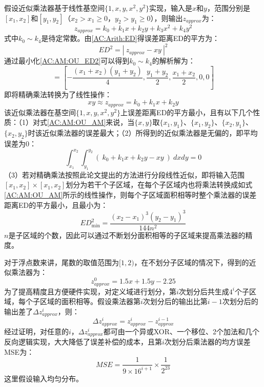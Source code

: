 假设近似乘法器基于线性基空间$\{1, x, y, x^2, y^2\}$实现，输入是$x$和$y$，范围分别是$[x_1,x_2]$和$[y_1,y_2]$（$x_2 > x_1 \ge 0$，$y_2 > y_1 \ge 0$），则输出$z_{approx}$为：
\begin{equation}
    z_{approx} = k_0 + k_1 x + k_2 y + k_3 x^2 + k_4 y^2
\end{equation}
式中$k_0 \sim k_4$是待定常数。由\eqref{AC:Arith:ED}得误差距离ED的平方为：
\begin{equation}
    ED^2 = | \ z_{approx} - xy \ | ^2
\label{AC:AM:OU_ED2}
\end{equation}
通过最小化\eqref{AC:AM:OU_ED2}可以得到$k_0 \sim k_4$的解析解为：
\begin{equation}
    [k_{0}, k_{1}, k_{2}, k_{3}, k_{4}]=[-\frac{(x_{1}+x_{2})(y_{1}+y_{2})}{4},\frac{y_{1}+y_{2}}{2},\frac{x_{1}+x_{2}}{2}, 0,0]
\end{equation}
即将精确乘法转换为了线性操作：
\begin{equation} 
    xy \approx z_{approx} = k_{0}+k_{1}x+k_{2}y
\label{AC:AM:OU_AM}
\end{equation}
该近似乘法器在基空间$\{1, x, y, x^2, y^2\}$上误差距离ED的平方最小，且有以下几个性质：（1）对式\eqref{AC:AM:OU_AM}来说，当$\{x,y\}$取$\{x_1,y_1\}$、$\{x_1,y_2\}$、$\{x_2,y_1\}$、$\{x_2,y_2\}$时该近似乘法器的误差最大；（2）所得到的近似乘法器是无偏的，即平均误差为0：
\begin{equation} 
    \int\nolimits_{x_{1}}^{x_{2}}\int\nolimits_{y_{1}}^{y_{2}} ( \ k_{0}+k_{1}x+k_{2}y - xy \ ) \ dxdy = 0
\end{equation}
（3）若对精确乘法按照此论文提出的方法进行分段线性近似，即将输入范围$[x_1,x_2] \times [x_1,x_2]$划分为若干个子区域，在每个子区域内也将乘法转换成如式\eqref{AC:AM:OU_AM}所示的线性操作，则每个子区域面积相等时整个乘法器的误差距离ED的平方最小，且最小为：
\begin{equation}
    ED^2_\text{min} = \dfrac{ (x_2 - x_1)^3 (y_2 - y_1)^3 }{144 n^2}
\end{equation}
$n$是子区域的个数，因此可以通过不断划分面积相等的子区域来提高乘法器的精度。

对于浮点数来讲，尾数的取值范围为$[1,2)$，在不划分子区域的情况下，得到的近似乘法器为：
\begin{equation}
    z^0_{approx} = 1.5 x + 1.5 y - 2.25
\end{equation}
为了提高精度且方便硬件实现，对定义域进行划分，第$i$次划分后共生成$4^i$个子区域，每个子区域的面积相等。假设乘法器第$i$次划分后的输出比第$i-1$次划分后的输出差了$\Delta z^i_{approx}$，则：
\begin{equation}
    \Delta z^i_{approx} = z^i_{approx} -  z^{i-1}_{approx}
\end{equation}
经过证明，对任意的$i$，$\Delta z^i_{approx}$都可由一个异或XOR、一个移位、2个加法和几个反向逻辑实现，大大降低了误差补偿的成本，且第$i$次划分后乘法器的均方误差MSE为：
\begin{equation}
    MSE = \frac{1}{9\times 16^{i + 1}} \times \frac{1}{2^{23}}
\end{equation}
这里假设输入均匀分布。

